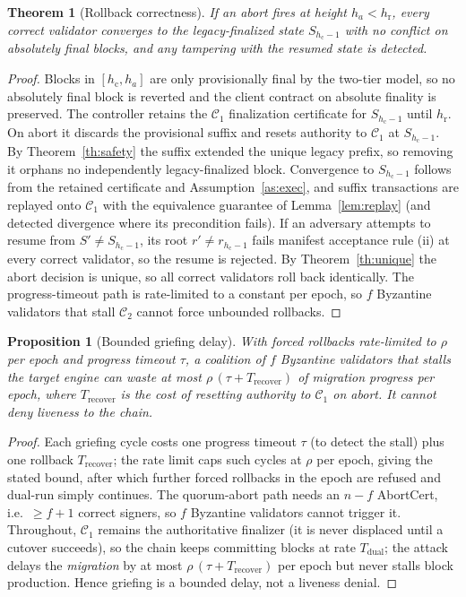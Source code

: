 \documentclass[journal]{IEEEtran}
\newtheorem{theorem}{Theorem}
\newtheorem{proposition}{Proposition}
\theoremstyle{remark}
\begin{document}
\begin{theorem}[Rollback correctness]
\label{th:rollback}
If an abort fires at height $h_a<h_{\mathrm{r}}$, every correct validator converges to the
legacy-finalized state $S_{h_{\mathrm{c}}-1}$ with no conflict on absolutely final blocks, and
any tampering with the resumed state is detected.
\end{theorem}
\begin{proof}
Blocks in $[h_{\mathrm{c}},h_a]$ are only provisionally final by the two-tier model, so no
absolutely final block is reverted and the client contract on absolute finality is preserved.
The controller retains the $\mathcal{C}_1$ finalization certificate for $S_{h_{\mathrm{c}}-1}$
until $h_{\mathrm{r}}$. On abort it discards the provisional suffix and resets authority to
$\mathcal{C}_1$ at $S_{h_{\mathrm{c}}-1}$. By Theorem~\ref{th:safety} the suffix extended the
unique legacy prefix, so removing it orphans no independently legacy-finalized block.
Convergence to $S_{h_{\mathrm{c}}-1}$ follows from the retained certificate and
Assumption~\ref{as:exec}, and suffix transactions are replayed onto $\mathcal{C}_1$ with the
equivalence guarantee of Lemma~\ref{lem:replay} (and detected divergence where its precondition
fails). If an adversary attempts to resume from $S'\ne S_{h_{\mathrm{c}}-1}$, its root
$r'\ne r_{h_{\mathrm{c}}-1}$ fails manifest acceptance rule (ii) at every correct validator, so
the resume is rejected. By Theorem~\ref{th:unique} the abort decision is unique, so all correct
validators roll back identically. The progress-timeout path is rate-limited to a constant per
epoch, so $f$ Byzantine validators that stall $\mathcal{C}_2$ cannot force unbounded rollbacks.
\end{proof}

\begin{proposition}[Bounded griefing delay]
\label{prop:grief}
With forced rollbacks rate-limited to $\rho$ per epoch and progress timeout $\tau$, a coalition of
$f$ Byzantine validators that stalls the target engine can waste at most
$\rho\,(\tau + T_{\mathrm{recover}})$ of migration progress per epoch, where $T_{\mathrm{recover}}$
is the cost of resetting authority to $\mathcal{C}_1$ on abort. It cannot deny liveness to the chain.
\end{proposition}
\begin{proof}
Each griefing cycle costs one progress timeout $\tau$ (to detect the stall) plus one rollback
$T_{\mathrm{recover}}$; the rate limit caps such cycles at $\rho$ per epoch, giving the stated bound,
after which further forced rollbacks in the epoch are refused and dual-run simply continues. The
quorum-abort path needs an $n-f$ AbortCert, i.e.\ $\ge f+1$ correct signers, so $f$ Byzantine
validators cannot trigger it. Throughout, $\mathcal{C}_1$ remains the authoritative finalizer
(it is never displaced until a cutover succeeds), so the chain keeps committing blocks at rate
$T_{\mathrm{dual}}$; the attack delays the \emph{migration} by at most $\rho\,(\tau+T_{\mathrm{recover}})$
per epoch but never stalls block production. Hence griefing is a bounded delay, not a liveness denial.
\end{proof}
\end{document}
